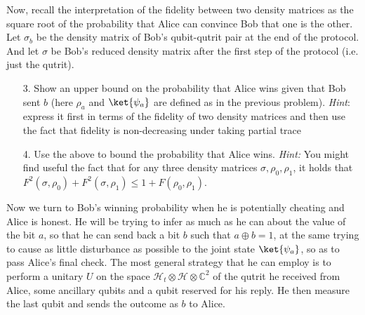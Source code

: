\begin{exercises}
Now, recall the interpretation of the fidelity between two density matrices as the square root of the probability that Alice can convince Bob that one is the other.
Let $\sigma_b$ be the density matrix of Bob's qubit-qutrit pair at the end of the protocol. And let $\sigma$ be Bob's reduced density matrix after the first step of the protocol (i.e. just the qutrit).
\begin{enumerate}
\item[3.] Show an upper bound on the probability that Alice wins given that Bob sent $b$ (here $\rho_a$ and $\ket{\psi_a}$ are defined as in the previous problem). \textit{Hint}: express it first in terms of the fidelity of two density matrices and then use the fact that fidelity is non-decreasing under taking partial trace
\item[4.] Use the above to bound the probability that Alice wins. \textit{Hint:} You might find useful the fact that for any three density matrices $\sigma, \rho_0, \rho_1$, it holds that $F^2(\sigma, \rho_0) + F^2(\sigma, \rho_1) \leq 1+F(\rho_0, \rho_1)$.
\end{enumerate}
Now we turn to Bob's winning probability when he is potentially cheating and Alice is honest. He will be trying to infer as much as he can about the value of the bit $a$, so that he can send back a bit $b$ such that $a \oplus b= 1$, at the same trying to cause as little disturbance as possible to the joint state $\ket{\psi_a}$, so as to pass Alice's final check. The most general strategy that he can employ is to perform a unitary $U$ on the space $\mathcal{H}_t \otimes \mathcal{H} \otimes \mathbb{C}^2$ of the qutrit he received from Alice, some ancillary qubits and a qubit reserved for his reply. He then measure the last qubit and sends the outcome as $b$ to Alice.


\end{exercises}
